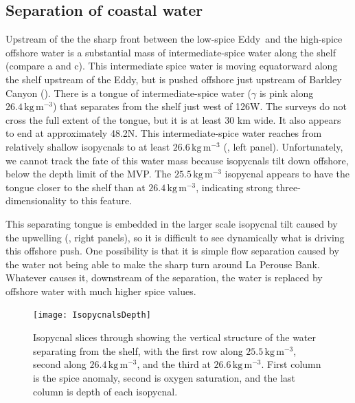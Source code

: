 \documentclass[draft]{agujournal2019}
\newcommand*{\Eddy}{{\sc Eddy}}
\begin{document}
\subsection{Separation of coastal water}

Upstream of the the sharp front between the low-spice \Eddy\ and the high-spice offshore water is a substantial mass of intermediate-spice water along the shelf (compare a and c).   This intermediate spice water is moving equatorward along the shelf upstream of the \Eddy, but is pushed offshore just upstream of Barkley Canyon ().  There is a tongue of intermediate-spice water ($\gamma$ is pink along $26.4\,\mathrm{kg\,m^{-3}}$) that separates from the shelf just west of 126\textdegree W. The surveys do not cross the full extent of the  tongue, but it is at least 30 km wide. It also appears to end at approximately 48.2\textdegree N.  This intermediate-spice water reaches from relatively shallow isopycnals to at least $26.6\,\mathrm{kg\,m^{-3}}$ (, left panel).  Unfortunately, we cannot track the fate of this water mass because isopycnals tilt down offshore, below the depth limit of the MVP.   The $25.5\,\mathrm{kg\,m^{-3}}$ isopycnal appears to have the tongue closer to the shelf than at $26.4\,\mathrm{kg\,m^{-3}}$, indicating strong three-dimensionality to this feature.

This separating tongue is embedded in the larger scale isopycnal tilt caused by the upwelling (, right panels), so it is difficult to see dynamically what is driving this offshore push.  One possibility is that it is simple flow separation caused by the water not being able to make the sharp turn around La Perouse Bank.  Whatever causes it, downstream of the separation, the water is replaced by offshore water with much higher spice values.

\begin{figure}[htbp]
  \begin{center}
    \texttt{[image: IsopycnalsDepth]}
    \caption{Isopycnal slices through showing the vertical structure of the water separating from the shelf, with the first row along $25.5 \,\mathrm{kg\,m^{-3}}$, second along $26.4\,\mathrm{kg\,m^{-3}}$, and the third at $26.6\,\mathrm{kg\,m^{-3}}$.  First column is the spice anomaly, second is oxygen saturation, and the last column is depth of each isopycnal.
      \label{fig:IsopycnalsDepth} }
  \end{center}
\end{figure}
\end{document}
